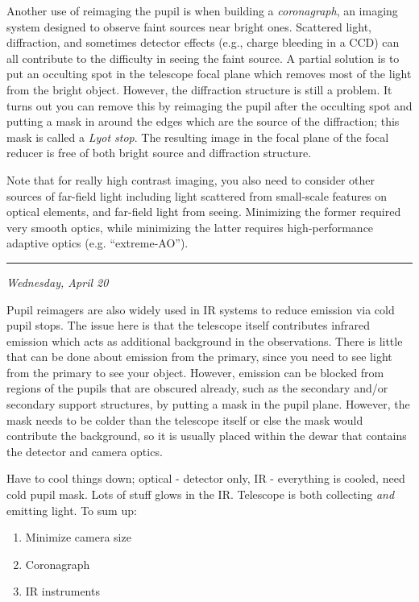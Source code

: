 \documentclass[12pt]{article}
\newcommand{\mynotes}[1]{\textcolor{myBlue}{#1}}
\newcommand{\mydate}[1]{
    \begin{flushright}
        \rule{\textwidth}{0.4pt} %
        \footnotesize\hfill\textit{#1}
    \end{flushright}}
\begin{document}
Another use of reimaging the pupil is when building a \textit{coronagraph}, an
imaging system designed to observe faint sources near bright ones. Scattered
light, diffraction, and sometimes detector effects (e.g., charge bleeding in a
CCD) can all contribute to the difficulty in seeing the faint source. A partial
solution is to put an occulting spot in the telescope focal plane which removes
most of the light from the bright object. However, the diffraction structure is
still a problem. It turns out you can remove this by reimaging the pupil after
the occulting spot and putting a mask in around the edges which are the source
of the diffraction; this mask is called a \emph{Lyot stop}. The resulting image
in the focal plane of the focal reducer is free of both bright source and
diffraction structure.

Note that for really high contrast imaging, you also need to consider
other sources of far-field light including light scattered from
small-scale features on optical elements, and far-field light from
seeing. Minimizing the former required very smooth optics, while
minimizing the latter requires high-performance adaptive optics (e.g.
``extreme-AO'').

\mydate{Wednesday, April 20}

Pupil reimagers are also widely used in IR systems to reduce emission via cold
pupil stops. The issue here is that the telescope itself contributes infrared
emission which acts as additional background in the observations. There is
little that can be done about emission from the primary, since you need to see
light from the primary to see your object. However, emission can be blocked
from regions of the pupils that are obscured already, such as the secondary
and/or secondary support structures, by putting a mask in the pupil plane.
However, the mask needs to be colder than the telescope itself or else the mask
would contribute the background, so it is usually placed within the dewar that
contains the detector and camera optics.

\mynotes{Have to cool things down; optical - detector only, IR - everything is
cooled, need cold pupil mask. Lots of stuff glows in the IR. Telescope is both
collecting \emph{and} emitting light. To sum up:
\begin{enumerate}
    \item Minimize camera size
    \item Coronagraph
    \item IR instruments
\end{enumerate}}
\end{document}
